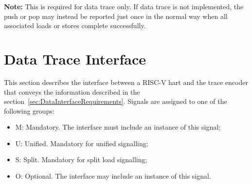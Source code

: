 \textbf{Note:} This is required for data trace only.  If data trace is not implemented, the push or pop
may instead be reported just once in the normal way when all associated loads or stores complete successfully.

\section{Data Trace Interface}\label{sec:DataTraceInterface}

This section describes the interface between a RISC-V hart and the
trace encoder that conveys the information described in the
section~\ref{sec:DataInterfaceRequirements}.  Signals are assigned to
one of the following groups:

\begin{itemize}
  \item M: Mandatory.  The interface must include an instance of this signal;
  \item U: Unified.  Mandatory for unified signalling;
  \item S: Split.  Mandatory for split load signalling;
  \item O: Optional.  The interface may include an instance of this signal.
\end{itemize}

